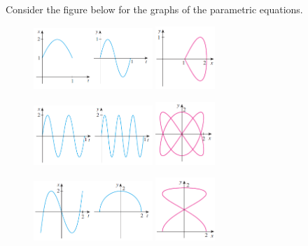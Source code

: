 \begin{Answer}\phantom{}
    Consider the figure below %
    for the graphs of the parametric equations.
    
    \begin{figure}[H]
    \centerline{
    \includegraphics[width=0.4\textwidth]{fig_match_graphs_par_eq_a}
    \hspace{1cm}
    \includegraphics[width=0.2\textwidth]{fig_match_graphs_par_curve_III}
     }
    \centerline{
   \includegraphics[width=0.4\textwidth]{fig_match_graphs_par_eq_b}
    \hspace{1cm} 
   \includegraphics[width=0.2\textwidth]{fig_match_graphs_par_curve_I}
    }
    \centerline{
    \includegraphics[width=0.4\textwidth]{fig_match_graphs_par_eq_c}
    \hspace{1cm} 
    \includegraphics[width=0.2\textwidth]{fig_match_graphs_par_curve_IV}
}
\end{figure}
\end{Answer}
